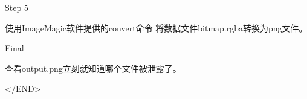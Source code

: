 ﻿\documentclass{beamer}
\begin{document}
  \begin{frame}{Step 5}
  \begin{framedtext}
    使用ImageMagic软件提供的convert命令
    将数据文件bitmap.rgba转换为png文件。
  \end{framedtext}
  \end{frame}
  
  \begin{frame}
  \end{frame}
  
  \begin{frame}{Final}
  \begin{framedtext}
    查看output.png立刻就知道哪个文件被泄露了。
  \end{framedtext}
  \end{frame}
  
  \begin{frame}
    \begin{center}
      \Large
      \textless/END\textgreater
    \end{center}
  \end{frame}
  
\end{document}
